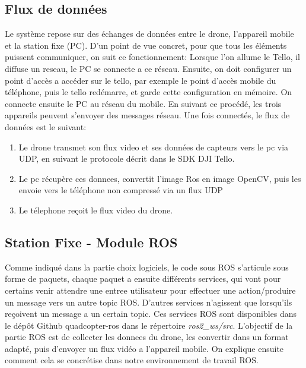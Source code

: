 \documentclass{article}
\begin{document}
\subsection{Flux de donn\'ees}
Le syst\`eme repose sur des \'echanges de donn\'ees entre le drone, l'appareil mobile et la station fixe (PC). 
D'un point de vue concret, pour que tous les \'el\'ements puissent communiquer,
on suit ce fonctionnement: Lorsque l'on allume le Tello, il diffuse un reseau,
le PC se connecte a ce r\'eseau. Ensuite, on doit configurer un point d'acc\`es
a acc\'eder sur le tello, par exemple le point d'acc\`es mobile du
t\'el\'ephone, puis le tello red\'emarre, et garde cette configuration en
m\'emoire. On connecte ensuite le PC au r\'eseau du mobile. En suivant
ce proc\'ed\'e, les trois appareils peuvent s'envoyer des messages r\'eseau. Une
fois connect\'es, le flux de donn\'ees est le suivant:

\begin{enumerate}
    \item Le drone transmet son flux video et ses donn\'ees de capteurs vers le pc via UDP, en suivant le protocole d\'ecrit dans le SDK DJI Tello\cite{tellosdk}.
    \item Le pc r\'ecup\`ere ces donnees, convertit l'image Ros en image OpenCV, puis les envoie vers le t\'el\'ephone non compress\'e via un flux UDP
    \item Le t\'elephone re\c coit le flux video du drone.
\end{enumerate}

\subsection{Station Fixe - Module ROS}
Comme indiqu\'e dans la partie choix logiciels, le code sous ROS s'articule sous
forme de paquets, chaque paquet a ensuite diff\'erents services, qui vont pour
certains venir attendre une entree utilisateur pour effectuer une
action/produire un message vers un autre topic ROS. D'autres services n'agissent
que lorsqu'ils re\c coivent un message a un certain topic. Ces services ROS sont
disponibles dans le d\'ep\^ot Github quadcopter-ros\cite{quadcopter_ros} dans le r\'epertoire
\textit{ros2\_ws/src}. L'objectif de la partie ROS est de collecter les donnees
du drone, les convertir dans un format adapt\'e, puis d'envoyer un flux vid\'eo
a l'appareil mobile.
On explique ensuite comment cela se concr\'etise dans notre environnement de travail ROS.
\end{document}
